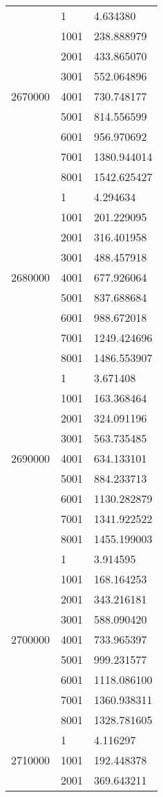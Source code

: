 \begin{table}[htb!]
\begin{tabular}{lll}
\multirow[c]{9}{*}{2670000} & 1 & 4.634380 \\
 & 1001 & 238.888979 \\
 & 2001 & 433.865070 \\
 & 3001 & 552.064896 \\
 & 4001 & 730.748177 \\
 & 5001 & 814.556599 \\
 & 6001 & 956.970692 \\
 & 7001 & 1380.944014 \\
 & 8001 & 1542.625427 \\
\multirow[c]{9}{*}{2680000} & 1 & 4.294634 \\
 & 1001 & 201.229095 \\
 & 2001 & 316.401958 \\
 & 3001 & 488.457918 \\
 & 4001 & 677.926064 \\
 & 5001 & 837.688684 \\
 & 6001 & 988.672018 \\
 & 7001 & 1249.424696 \\
 & 8001 & 1486.553907 \\
\multirow[c]{9}{*}{2690000} & 1 & 3.671408 \\
 & 1001 & 163.368464 \\
 & 2001 & 324.091196 \\
 & 3001 & 563.735485 \\
 & 4001 & 634.133101 \\
 & 5001 & 884.233713 \\
 & 6001 & 1130.282879 \\
 & 7001 & 1341.922522 \\
 & 8001 & 1455.199003 \\
\multirow[c]{9}{*}{2700000} & 1 & 3.914595 \\
 & 1001 & 168.164253 \\
 & 2001 & 343.216181 \\
 & 3001 & 588.090420 \\
 & 4001 & 733.965397 \\
 & 5001 & 999.231577 \\
 & 6001 & 1118.086100 \\
 & 7001 & 1360.938311 \\
 & 8001 & 1328.781605 \\
\multirow[c]{9}{*}{2710000} & 1 & 4.116297 \\
 & 1001 & 192.448378 \\
 & 2001 & 369.643211 \\

\end{tabular}
\end{table}
